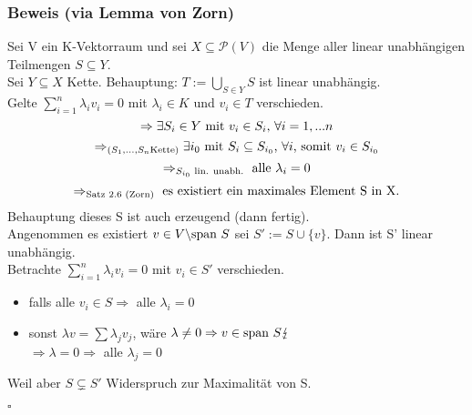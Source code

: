 \documentclass[a4paper, 12pt]{extarticle}
\newcommand{\tn}[1]{\textnormal {#1}}
\begin{document}
\subsubsection*{Beweis (via Lemma von Zorn)}
Sei V ein K-Vektorraum und sei $X \subseteq \mathcal P(V)$ die Menge aller linear unabhängigen Teilmengen $S \subseteq Y$. \\
Sei $Y\subseteq X$ Kette. Behauptung: $T:=\bigcup_{S\in Y} S$ ist linear unabhängig. \\
Gelte $\sum_{i=1}^n \lambda_i v_i = 0$ mit $\lambda_i \in K$ und $v_i \in T$ verschieden. \\
$$\Rightarrow \exists S_i \in Y\tn{ mit }v_i \in S_i\tn{, }\forall i=1,...n$$
$$\Rightarrow_{\tn(S_1,...,S_n \tn{Kette)}} \exists i_0\tn{ mit }S_i \subseteq S_{i_0}\tn{, } \forall i\tn{, somit }v_i \in S_{i_0}$$
$$\Rightarrow_{S_{i_0}\tn{ lin. unabh.}}\tn{ alle }\lambda_i=0$$
$$\Rightarrow_{\tn{Satz 2.6 (Zorn)}}\tn{ es existiert ein maximales Element S in X.}$$
Behauptung dieses S ist auch erzeugend (dann fertig).\\
Angenommen es existiert $v\in V\backslash\tn{span }S$ sei $S':= S\cup \{v\}$. Dann ist S' linear unabhängig.\\
Betrachte $\sum_{i=1}^n\lambda_iv_i=0$ mit $v_i\in S'$ verschieden.
\begin{itemize}
\item falls alle $v_i\in S \Rightarrow$ alle $\lambda_i = 0$
\item sonst $\lambda v = \sum \lambda_j v_j$, wäre $\lambda \neq 0 \Rightarrow v\in \tn{span }S \lightning$\\
$\Rightarrow \lambda = 0 \Rightarrow$ alle $\lambda_j=0$
\end{itemize}
Weil aber $S\subsetneq S'$ Widerspruch zur Maximalität von S.
\begin{flushright}
$\square$\\
\end{flushright}
\end{document}
